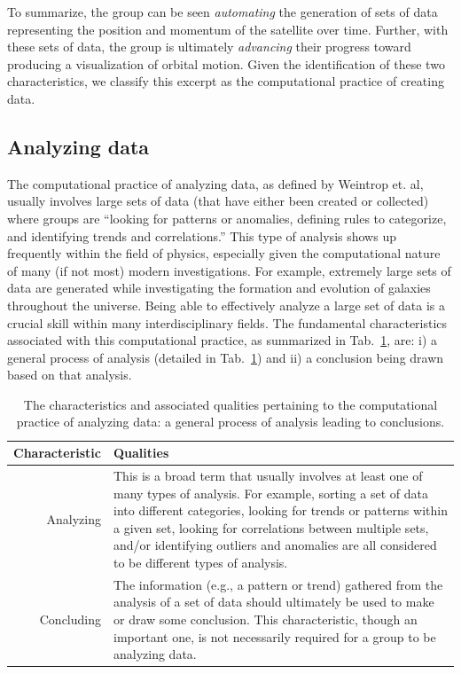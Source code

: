 \documentclass{msuphddissertation}
\begin{document}
\begin{doublespace}
To summarize, the group can be seen \textit{automating} the generation of sets of data representing the position and momentum of the satellite over time.  Further, with these sets of data, the group is ultimately \textit{advancing} their progress toward producing a visualization of orbital motion.  Given the identification of these two characteristics, we classify this excerpt as the computational practice of creating data.

%
%
%
%
%
%
%
%
%
%
%
%
%
%
%
%

\subsection{Analyzing data}\label{CH5:SecAnalyzingData}

The computational practice of analyzing data, as defined by Weintrop et. al, usually involves large sets of data (that have either been created or collected) where groups are ``looking for patterns or anomalies, defining rules to categorize, and identifying trends and correlations.''  This type of analysis shows up frequently within the field of physics, especially given the computational nature of many (if not most) modern investigations.  For example, extremely large sets of data are generated while investigating the formation and evolution of galaxies throughout the universe.  Being able to effectively analyze a large set of data is a crucial skill within many interdisciplinary fields.  The fundamental characteristics associated with this computational practice, as summarized in Tab.~\ref{CH5:AnalyzingData}, are: i) a general process of analysis (detailed in Tab.~\ref{CH5:AnalyzingData}) and ii) a conclusion being drawn based on that analysis.

\begin{table}
\begin{tabular}{r|p{}}
Characteristic & Qualities \\\hline\hline
Analyzing & This is a broad term that usually involves at least one of many types of analysis.  For example, sorting a set of data into different categories, looking for trends or patterns within a given set, looking for correlations between multiple sets, and/or identifying outliers and anomalies are all considered to be different types of analysis.\\
Concluding & The information (e.g., a pattern or trend) gathered from the analysis of a set of data should ultimately be used to make or draw some conclusion.  This characteristic, though an important one, is not necessarily required for a group to be analyzing data.\\
\end{tabular}\caption{The characteristics and associated qualities pertaining to the computational practice of analyzing data: a general process of analysis leading to conclusions.}\label{CH5:AnalyzingData}
\end{table}


\end{doublespace}
\end{document}
